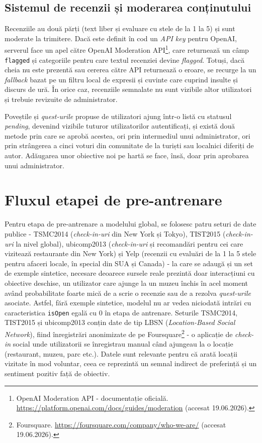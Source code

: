 \documentclass[12pt,a4paper]{report}
\begin{document}
\subsection{Sistemul de recenzii și moderarea conținutului}

Recenziile au două părți (text liber și evaluare cu stele de la 1 la 5) și sunt moderate la trimitere. Dacă este definit în cod un \textit{API key} pentru OpenAI, serverul face un apel către OpenAI Moderation API\footnote{OpenAI Moderation API - documentație oficială. \url{https://platform.openai.com/docs/guides/moderation} (accesat 19.06.2026).}, care returnează un câmp \texttt{flagged} și categoriile pentru care textul recenziei devine \textit{flagged}. Totuși, dacă cheia nu este prezentă sau cererea către API returnează o eroare, se recurge la un \textit{fallback} bazat pe un filtru local de expresii și cuvinte care cuprind insulte și discurs de ură. În orice caz, recenziile semnalate nu sunt vizibile altor utilizatori și trebuie revizuite de administrator.

Poveștile și \textit{quest-urile} propuse de utilizatori ajung într-o listă cu statusul \textit{pending}, devenind vizibile tuturor utilizatorilor autentificați, și există două metode prin care se aprobă acestea, ori prin intermediul unui administrator, ori prin strângerea a cinci voturi din comunitate de la turiști sau localnici diferiți de autor. Adăugarea unor obiective noi pe hartă se face, însă, doar prin aprobarea unui administrator.

\section{Fluxul etapei de pre-antrenare}

Pentru etapa de pre-antrenare a modelului global, se folosesc patru seturi de date publice - TSMC2014 \cite{yang2015tsmc} (\textit{check-in-uri} din New York și Tokyo), TIST2015 \cite{yang2016tist} (\textit{check-in-uri} la nivel global), ubicomp2013 \cite{yang2013ubicomp} (\textit{check-in-uri} și recomandări pentru cei care vizitează restaurante din New York) și Yelp \cite{yelp2021dataset} (recenzii cu evaluări de la 1 la 5 stele pentru afaceri locale, în special din SUA și Canada) - la care se adaugă și un set de exemple sintetice, necesare deoarece sursele reale prezintă doar interacțiuni cu obiective deschise, un utilizator care ajunge la un muzeu închis în acel moment având probabilitate foarte mică de a scrie o recenzie sau de a rezolva \textit{quest-urile} asociate. Astfel, fără exemple sintetice, modelul nu ar vedea niciodată intrări cu caracteristica \texttt{isOpen} egală cu 0 în etapa de antrenare. Seturile TSMC2014, TIST2015 și ubicomp2013 conțin date de tip LBSN (\textit{Location-Based Social Network}), fiind înregistrări anonimizate de pe Foursquare\footnote{Foursquare. \url{https://foursquare.com/company/who-we-are/} (accesat 19.06.2026).} - o aplicație de \textit{check-in} social unde utilizatorii se înregistrau manual când ajungeau la o locație (restaurant, muzeu, parc etc.). Datele sunt relevante pentru că arată locații vizitate în mod voluntar, ceea ce reprezintă un semnal indirect de preferință și un sentiment pozitiv față de obiectiv.
\end{document}
